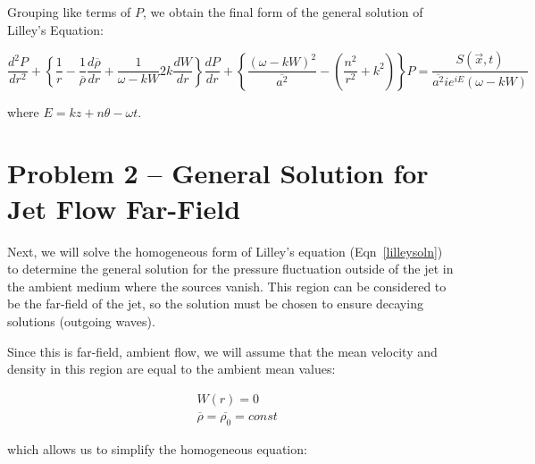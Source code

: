 \documentclass[]{aiaa-tc}%
\begin{document}
Grouping like terms of $P$, we obtain the final form of the general solution of Lilley's Equation:

\begin{equation} \label{lilleysoln}
\boxed{
\dfrac{d^2P}{dr^2}
+ \left\{
    \dfrac{1}{r}
    - \dfrac{1}{\overline{\rho}}\frac{d \overline{\rho}}{dr}
    + \dfrac{1}{\omega - kW} 2k \dfrac{dW}{dr}
\right\} \dfrac{dP}{dr}
+ \left\{
    \dfrac{(\omega - kW)^2}{\overline{a^2}}
    - \left( \dfrac{n^2}{r^2} + k^2 \right)
\right\} P
= \dfrac{S(\vec{x}, t)}{\overline{a^2} ie^{iE} (\omega - kW)} }
\end{equation}

\noindent where $E=kz + n\theta -\omega t$.





\section{Problem 2 -- General Solution for Jet Flow Far-Field} %

Next, we will solve the homogeneous form of Lilley's equation (Eqn~\ref{lilleysoln}) to determine the general solution for the pressure fluctuation outside of the jet in the ambient medium where the sources vanish.  This region can be considered to be the far-field of the jet, so the solution must be chosen to ensure decaying solutions (outgoing waves).

Since this is far-field, ambient flow, we will assume that the mean velocity and density in this region are equal to the ambient mean values:

\begin{equation}
\begin{split}
&W(r)=0 \\
&\overline{\rho} = \overline{\rho_0} = const
\end{split}
\end{equation}

\noindent which allows us to simplify the homogeneous equation:
\end{document}
